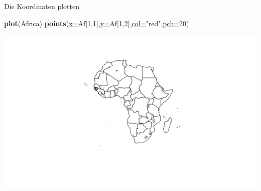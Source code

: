 \documentclass[ignorenonframetext,]{beamer}
\newenvironment{Shaded}{\begin{snugshade}}{\end{snugshade}}
\newcommand{\DataTypeTok}[1]{\textcolor[rgb]{0.74,0.68,0.62}{\underline{#1}}}
\newcommand{\DecValTok}[1]{\textcolor[rgb]{0.27,0.67,0.26}{#1}}
\newcommand{\KeywordTok}[1]{\textcolor[rgb]{0.26,0.66,0.93}{\textbf{#1}}}
\newcommand{\NormalTok}[1]{\textcolor[rgb]{0.74,0.68,0.62}{#1}}
\newcommand{\StringTok}[1]{\textcolor[rgb]{0.02,0.61,0.04}{#1}}
\begin{document}
\begin{frame}[fragile]{Die Koordinaten plotten}
\protect\hypertarget{die-koordinaten-plotten}{}

\begin{Shaded}
\begin{Highlighting}[]
\KeywordTok{plot}\NormalTok{(Africa)}
\KeywordTok{points}\NormalTok{(}\DataTypeTok{x=}\NormalTok{Af[}\DecValTok{1}\NormalTok{,}\DecValTok{1}\NormalTok{],}\DataTypeTok{y=}\NormalTok{Af[}\DecValTok{1}\NormalTok{,}\DecValTok{2}\NormalTok{],}\DataTypeTok{col=}\StringTok{"red"}\NormalTok{,}\DataTypeTok{pch=}\DecValTok{20}\NormalTok{)}
\end{Highlighting}
\end{Shaded}

\includegraphics{A7_spdep_files/figure-beamer/unnamed-chunk-13-1.pdf}

\end{frame}
\end{document}
